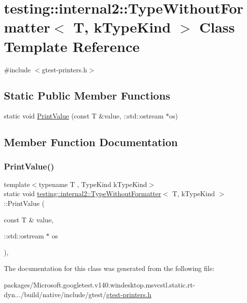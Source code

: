 \hypertarget{classtesting_1_1internal2_1_1_type_without_formatter}{}\section{testing\+::internal2\+::Type\+Without\+Formatter$<$ T, k\+Type\+Kind $>$ Class Template Reference}
\label{classtesting_1_1internal2_1_1_type_without_formatter}


{\ttfamily \#include $<$gtest-\/printers.\+h$>$}

\subsection*{Static Public Member Functions}
\begin{DoxyCompactItemize}
\item 
static void \mbox{\hyperlink{classtesting_1_1internal2_1_1_type_without_formatter_a6651f6f7be2c0f899729eeb6038f76d3}{Print\+Value}} (const T \&value, \+::std\+::ostream $\ast$os)
\end{DoxyCompactItemize}


\subsection{Member Function Documentation}
\mbox{\label{classtesting_1_1internal2_1_1_type_without_formatter_a6651f6f7be2c0f899729eeb6038f76d3}} 
\subsubsection{\texorpdfstring{PrintValue()}{PrintValue()}}
{\footnotesize\ttfamily template$<$typename T , Type\+Kind k\+Type\+Kind$>$ \\
static void \mbox{\hyperlink{classtesting_1_1internal2_1_1_type_without_formatter}{testing\+::internal2\+::\+Type\+Without\+Formatter}}$<$ T, k\+Type\+Kind $>$\+::Print\+Value (\begin{DoxyParamCaption}\item[{const T \&}]{value,  }\item[{\+::std\+::ostream $\ast$}]{os }\end{DoxyParamCaption})\hspace{0.3cm}{\ttfamily [inline]}, {\ttfamily [static]}}



The documentation for this class was generated from the following file\+:\begin{DoxyCompactItemize}
\item 
packages/\+Microsoft.\+googletest.\+v140.\+windesktop.\+msvcstl.\+static.\+rt-\/dyn.../build/native/include/gtest/\mbox{\hyperlink{gtest-printers_8h}{gtest-\/printers.\+h}}\end{DoxyCompactItemize}

